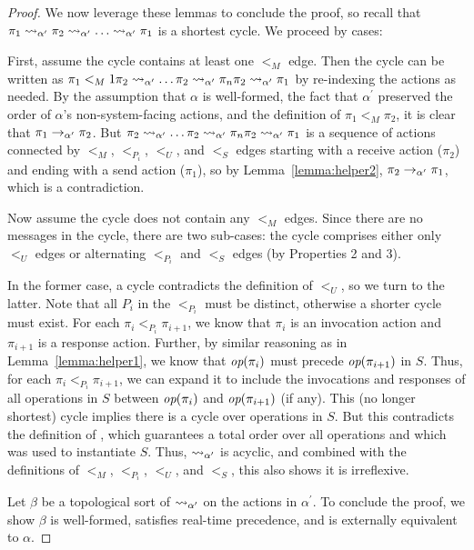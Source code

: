 \begin{proof}
  We now leverage these lemmas to conclude the proof, so recall that
  $\pi_1 \rightsquigarrow_{\alpha^\prime} \pi_2 \rightsquigarrow_{\alpha^\prime} \ldots \rightsquigarrow_{\alpha^\prime} \pi_1$
  is a shortest cycle. We proceed by cases:

  First, assume the cycle contains at least one $<_M$ edge. Then the cycle can be written as
  $\pi_1 <_M1 \pi_2 \rightsquigarrow_{\alpha^\prime} \ldots \pi_2 \rightsquigarrow_{\alpha^\prime} \pi_n \pi_2 \rightsquigarrow_{\alpha^\prime} \pi_1$ 
  by re-indexing the actions as needed. By the assumption that $\alpha$ is well-formed,
  the fact that $\alpha^\prime$ preserved the order of $\alpha$'s non-system-facing actions,
  and the definition of $\pi_1 <_M \pi_2$, it is clear that $\pi_1 \rightarrow_{\alpha^\prime} \pi_2$.
  But $\pi_2 \rightsquigarrow_{\alpha^\prime} \ldots \pi_2 \rightsquigarrow_{\alpha^\prime} \pi_n \pi_2 \rightsquigarrow_{\alpha^\prime} \pi_1$
  is a sequence of actions connected by $<_M$, $<_{P_i}$, $<_U$, and $<_S$ edges
  starting with a receive action ($\pi_2$) and ending with a send action ($\pi_1$),
  so by Lemma~\ref{lemma:helper2}, $\pi_2 \rightarrow_{\alpha^\prime} \pi_1$, which is a contradiction.

  Now assume the cycle does not contain any $<_M$ edges. Since there are no messages in
  the cycle, there are two sub-cases: the cycle comprises either only $<_U$ edges or alternating
  $<_{P_i}$ and $<_S$ edges (by Properties 2 and 3).

  In the former case, a cycle contradicts the definition of $<_U$, so we turn to the latter.
  Note that all $P_i$ in the $<_{P_i}$ must be distinct, otherwise a shorter cycle must exist.
  For each $\pi_i <_{P_i} \pi_{i+1}$, we know that $\pi_i$ is an invocation action and
  $\pi_{i+1}$ is a response action. Further, by similar reasoning as in Lemma~\ref{lemma:helper1},
  we know that $\operatorname*{\textit{op}}(\pi_i)$ must precede $\operatorname*{\textit{op}}(\pi_{i+1})$ in $S$. Thus, for each $\pi_i <_{P_i} \pi_{i+1}$,
  we can expand it to include the invocations and responses of all operations in $S$ between $\operatorname*{\textit{op}}(\pi_i)$
  and $\operatorname*{\textit{op}}(\pi_{i+1})$ (if any). This (no longer shortest) cycle implies there is a cycle
  over operations in $S$. But this contradicts the definition of \MDL{}, which guarantees a total order
  over all operations and which was used to instantiate $S$. Thus, $\rightsquigarrow_{\alpha^\prime}$ is acyclic,
  and combined with the definitions of $<_M$, $<_{P_i}$, $<_U$, and $<_S$, this also shows
  it is irreflexive.

  Let $\beta$ be a topological sort of $\rightsquigarrow_{\alpha^\prime}$ on the actions in
  $\alpha^\prime$. To conclude the proof, we show $\beta$ is well-formed,
  satisfies \singledispatch{} real-time precedence, and is externally equivalent to $\alpha$.


\end{proof}
